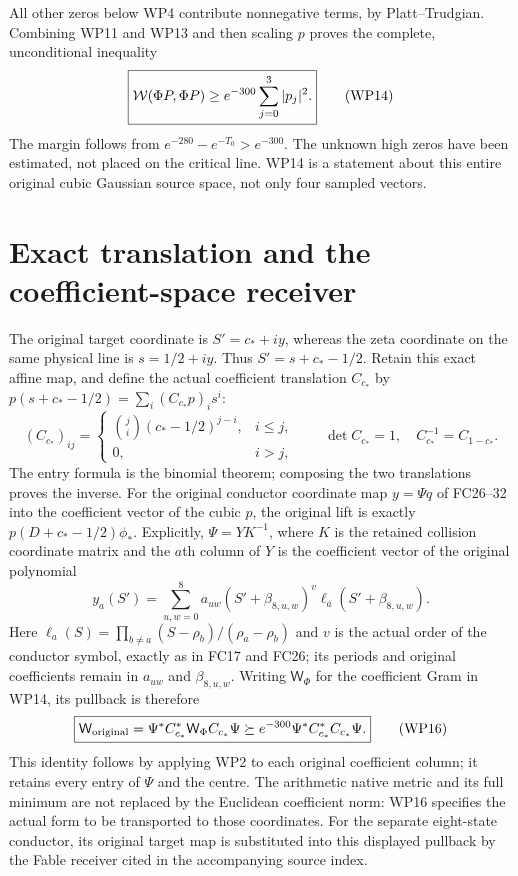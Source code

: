 \documentclass[11pt]{article}
\begin{document}
All other zeros below WP4 contribute nonnegative terms, by
Platt--Trudgian. Combining WP11 and WP13 and then scaling $p$
proves the complete, unconditional inequality
\[
 \boxed{\mathcal W(\Phi P,\Phi P)\ge e^{-300}\sum_{j=0}^3|p_j|^2.}
                                                                  \tag{WP14}
\]
The margin follows from $e^{-280}-e^{-T_0}>e^{-300}$.
The unknown high zeros have been estimated, not placed on the
critical line. WP14 is a statement about this entire original
cubic Gaussian source space, not only four sampled vectors.

\section{Exact translation and the coefficient-space receiver}
The original target coordinate is $S'=c_*+iy$, whereas the
zeta coordinate on the same physical line is $s=1/2+iy$.
Thus $S'=s+c_*-1/2$. Retain this exact affine map, and define
the actual coefficient translation $C_{c_*}$ by
$p(s+c_*-1/2)=\sum_i(C_{c_*}p)_i s^i$:
\[
 (C_{c_*})_{ij}=\begin{cases}\binom ji(c_*-1/2)^{j-i},&i\le j,\\
                  0,&i>j,\end{cases}\qquad
 \det C_{c_*}=1,\quad C_{c_*}^{-1}=C_{1-c_*}.                \tag{WP15}
\]
The entry formula is the binomial theorem; composing the two
translations proves the inverse. For the original conductor
coordinate map $y=\Psi q$ of FC26--32 \cite{swcert:FC} into the coefficient vector of the
cubic $p$, the original lift is exactly $p(D+c_*-1/2)\phi_*$.
Explicitly, $\Psi=YK^{-1}$, where $K$ is the retained collision
coordinate matrix and the $a$th column of $Y$ is the coefficient
vector of the original polynomial
\[
 y_a(S')=\sum_{u,w=0}^{8}a_{uw}
          (S'+\beta_{8,u,w})^v\ell_a(S'+\beta_{8,u,w}).
\]
Here $\ell_a(S)=\prod_{b\ne a}(S-\rho_b)/(\rho_a-\rho_b)$
and $v$ is the actual order of the conductor symbol, exactly as
in FC17 and FC26; its periods and original coefficients remain
in $a_{uw}$ and $\beta_{8,u,w}$.
Writing $\mathsf W_\Phi$ for the coefficient Gram in WP14,
its pullback is therefore
\[
 \boxed{\mathsf W_{\rm original}
  =\Psi^*C_{c_*}^*\mathsf W_\Phi C_{c_*}\Psi
  \succeq e^{-300}\Psi^*C_{c_*}^*C_{c_*}\Psi.}              \tag{WP16}
\]
This identity follows by applying WP2 to each original
coefficient column; it retains every entry of $\Psi$ and the
centre. The arithmetic native metric and its full minimum are
not replaced by the Euclidean coefficient norm: WP16 specifies
the actual form to be transported to those coordinates.
For the separate eight-state conductor, its original target map
is substituted into this displayed pullback by the Fable
receiver cited in the accompanying source index.
\end{document}

